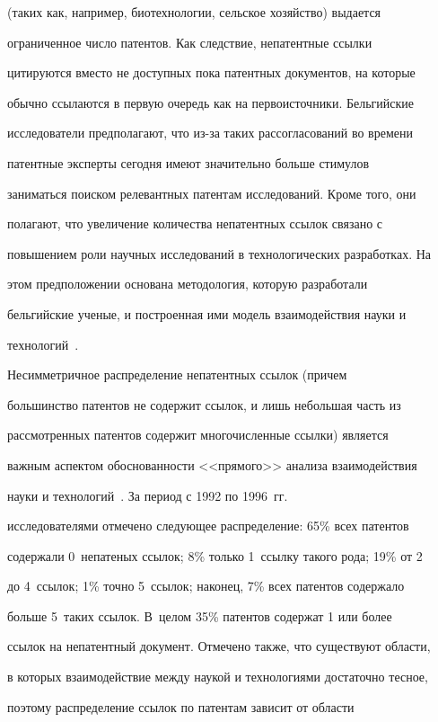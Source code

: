 (таких как, например, биотехнологии, сельское хозяйство) выдается 


ограниченное число патентов. Как следствие, непатентные ссылки 


цитируются вместо не доступных пока патентных документов, на которые 


обычно ссылаются в первую очередь как на первоисточники. Бельгийские 


исследователи предполагают, что из-за таких рассогласований во времени 


патентные эксперты сегодня имеют значительно больше стимулов 


заниматься поиском релевантных патентам исследований. Кроме того, они 


полагают, что увеличение количества непатентных ссылок связано с 


повышением роли научных исследований в технологических разработках. На 


этом предположении основана методология, которую разработали 


бельгийские ученые, и построенная ими модель взаимодействия науки и 


технологий~\cite{2-koz}.


     


     Несимметричное распределение непатентных ссылок (причем 


большинство патентов не содержит ссылок, и лишь небольшая часть из 


рассмотренных патентов содержит многочисленные ссылки) является 


важным аспектом обоснованности <<прямого>> анализа взаимодействия 


науки и технологий~\cite{15-koz, 16-koz}. За период с 1992 по 1996~гг.\ 


исследователями отмечено следующее распределение: 65\% всех патентов 


содержали 0~непатеных ссылок; 8\% только 1~ссылку такого рода; 19\% от 2 


до 4~ссылок; 1\% точно 5~ссылок; наконец, 7\% всех патентов содержало 


больше 5~таких ссылок. В~целом 35\% патентов содержат 1 или более 


ссылок на непатентный документ. Отмечено также, что существуют области, 


в которых взаимодействие между наукой и технологиями достаточно тесное, 


поэтому распределение ссылок по патентам зависит от области 


